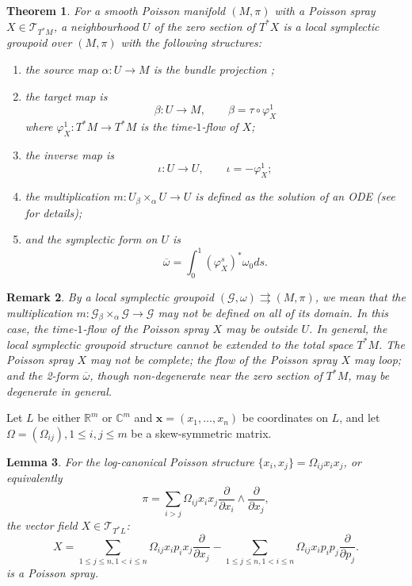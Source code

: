 \documentclass{amsart}
\newtheorem{theorem}{Theorem}[section]
\newtheorem{lemma}[theorem]{Lemma}
\newtheorem{remark}[theorem]{Remark}
\newcommand{\bfx}{\mathbf{x}}
\newcommand{\cG}{\mathcal{G}}
\newcommand{\cT}{\mathcal{T}}
\newcommand{\CC}{\mathbb{C}}
\newcommand{\RR}{\mathbb{R}}
\newcommand{\rra}{\rightrightarrows}
\begin{document}
\begin{theorem} \cite{MR2900786, CMS17} \label{thm:poissp}
For a smooth Poisson manifold $(M, \pi)$ with a Poisson spray $X \in \cT_{T^*M}$, a neighbourhood $U$ of the zero section of $T^*X$ is a local symplectic groupoid over $(M, \pi)$ with the following structures:
	\begin{enumerate}
		\item the source map $\alpha: U \to M$ is the bundle projection ;
		\item the target map is
			$$
				\beta: U \to M, \qquad \beta = \tau \circ \varphi_X^1
			$$
		where $\varphi_X^1: T^*M \to T^*M$ is the time-$1$-flow of $X$;
		\item the inverse map is
			$$
				\iota: U \to U, \qquad \iota = -\varphi_X^1;
			$$
		\item the multiplication $m: U {_\beta \times_\alpha} U \to U$ is defined as the solution of an ODE (see \cite{CMS17} for details);
		\item  and the symplectic form on $U$ is
			$$
				\overline{\omega} = \int_{0}^{1} (\varphi_X^s)^*\omega_0 ds.
			$$
	\end{enumerate}
\end{theorem}

\begin{remark}
	By a local symplectic groupoid $(\cG, \omega) \rra (M, \pi)$, we mean that the multiplication $m: \cG {_\beta \times_\alpha} \cG \to \cG$ may not be defined on all of its domain. In this case, the time-$1$-flow of the Poisson spray $X$ may be outside $U$.
In general, the local symplectic groupoid structure cannot be extended to the total space $T^*M$. The Poisson spray $X$ may not be complete; the flow of the Poisson spray $X$ may loop; and the 2-form $\overline{\omega}$, though non-degenerate near the zero section of $T^*M$, may be degenerate in general.
\end{remark}

Let $L$ be either $\RR^m$ or $\CC^m$ and $ \bfx = (x_1, \ldots, x_n)$ be coordinates on $L$, and let $\Omega = (\Omega_{ij}), 1 \leq i,j \leq m$ be a skew-symmetric matrix.

\begin{lemma}
For the log-canonical Poisson structure $\{x_i, x_j\} = \Omega_{ij} x_i x_j$, or equivalently
$$
	\pi = \sum_{i > j} \Omega_{ij} x_ix_j\frac{\partial}{\partial x_i} \wedge \frac{\partial}{\partial x_j},
$$
the vector field $X \in \cT_{T^*L}$:
\begin{equation} \label{eq: PoisSp}
		X = \sum_{1 \leq j \leq n, 1 < i \leq n}\Omega_{ij}x_i p_i x_j\frac{\partial}{\partial x_j} - \sum_{1 \leq j \leq n, 1 < i \leq n}\Omega_{ij}x_ip_i p_j\frac{\partial}{\partial p_j}.
\end{equation}
is a Poisson spray.
\end{lemma}
\end{document}

